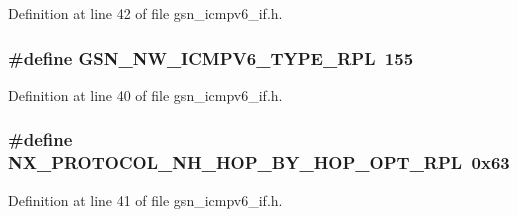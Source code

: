 Definition at line 42 of file gsn\_\-icmpv6\_\-if.h.

\hypertarget{a00517_a2642b7d250423c7b7524057d29b54511}{
\subsubsection[{GSN\_\-NW\_\-ICMPV6\_\-TYPE\_\-RPL}]{\setlength{\rightskip}{0pt plus 5cm}\#define GSN\_\-NW\_\-ICMPV6\_\-TYPE\_\-RPL~155}}
\label{a00517_a2642b7d250423c7b7524057d29b54511}


Definition at line 40 of file gsn\_\-icmpv6\_\-if.h.

\hypertarget{a00517_a6dc1fad08aee881cc17ed9712e82667e}{
\subsubsection[{NX\_\-PROTOCOL\_\-NH\_\-HOP\_\-BY\_\-HOP\_\-OPT\_\-RPL}]{\setlength{\rightskip}{0pt plus 5cm}\#define NX\_\-PROTOCOL\_\-NH\_\-HOP\_\-BY\_\-HOP\_\-OPT\_\-RPL~0x63}}
\label{a00517_a6dc1fad08aee881cc17ed9712e82667e}


Definition at line 41 of file gsn\_\-icmpv6\_\-if.h.



